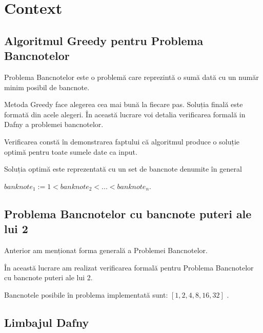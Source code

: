


\chapter{Context} 

\section{Algoritmul Greedy pentru Problema Bancnotelor} 
Problema Bancnotelor este o problemă care reprezintă o sumă dată cu un număr minim posibil de bancnote.\par
Metoda Greedy face alegerea cea mai bună la fiecare pas. Soluția finală este formată din acele alegeri.
În această lucrare voi detalia verificarea formală in Dafny a problemei bancnotelor.\par
Verificarea constă în demonstrarea faptului că algoritmul produce o soluție optimă pentru toate 
sumele date ca input. \par
Soluția optimă este reprezentată cu un set de bancnote denumite în general

$ banknote_{1}:= 1 < banknote_{2} < ... < banknote_{n} $. 


\section{Problema Bancnotelor cu bancnote puteri ale lui 2}
Anterior am menționat forma generală a Problemei Bancnotelor.\par
În această lucrare am realizat verificarea formală pentru Problema Bancnotelor cu bancnote puteri ale lui 2.\par
Bancnotele posibile în problema implementată sunt: 
$[1, 2, 4, 8, 16, 32]$ . 

\section{Limbajul Dafny} 
